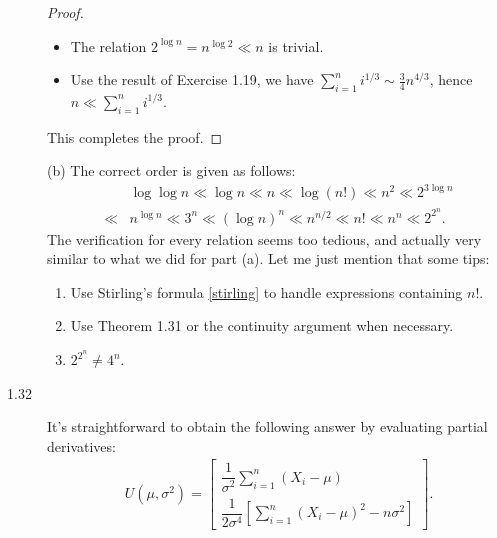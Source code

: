 \documentclass{article}
\theoremstyle{definition}
\theoremstyle{plain}
\theoremstyle{remark}
\begin{document}
\begin{description}
\begin{proof}
\begin{itemize}
\item The relation $2^{\log n} = n^{\log 2} \ll n$ is trivial.

\item Use the result of Exercise 1.19, we have $\sum\limits_{i = 1}^n i^{1/3} \sim 
\frac{3}{4}n^{4/3}$, hence $n \ll \sum\limits_{i = 1}^n i^{1/3}$.
\end{itemize}
This completes the proof.
\end{proof}

(b) The correct order is given as follows:
\begin{align*}
    & \log\log n \ll \log n \ll n \ll \log(n!) \ll n^2 \ll 2^{3\log n} \\
    \ll & n^{\log n} \ll 3^n \ll (\log n)^n \ll n^{n/2} \ll n! \ll n^n \ll 2^{2^n}.
\end{align*}
The verification for every relation seems too tedious, and actually very similar to what 
we did for part (a). Let me just mention that some tips:
\begin{enumerate}
\item Use Stirling's formula \eqref{stirling} to handle expressions containing $n!$.
\item Use Theorem 1.31 or the continuity argument when necessary.
\item $2^{2^n} \neq 4^n$.
\end{enumerate}

\item[1.32] 
It's straightforward to obtain the following answer by evaluating partial derivatives:
\begin{align*}
    U(\mu, \sigma^2) = \begin{bmatrix}
    \dfrac{1}{\sigma^2}\sum\limits_{i = 1}^n (X_i - \mu) \\
    \dfrac{1}{2\sigma^4}\left[\sum\limits_{i = 1}^n (X_i - \mu)^2 - n\sigma^2\right]
    \end{bmatrix}.
\end{align*}
\end{description}

\newpage
\end{document}
